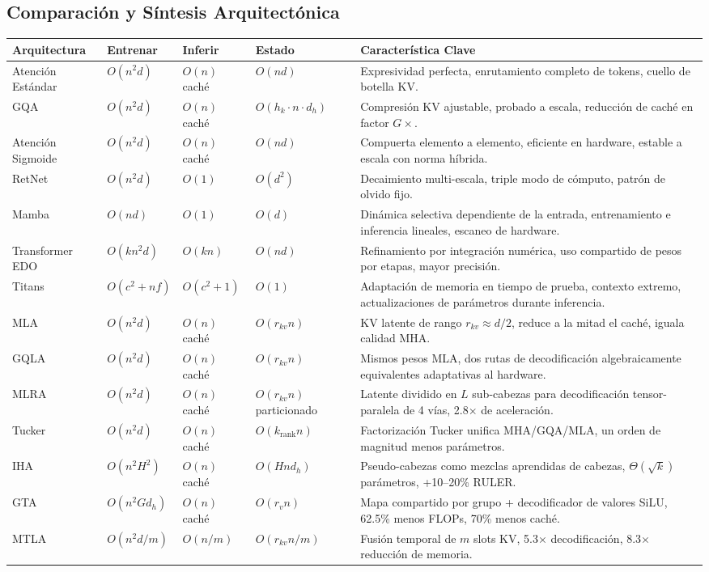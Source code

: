 \subsection{Comparación y Síntesis Arquitectónica}

\small
\begin{longtable}{p{2.0cm}p{1.8cm}p{1.6cm}p{1.6cm}p{4.5cm}}
\toprule
\textbf{Arquitectura} & \textbf{Entrenar} & \textbf{Inferir} & \textbf{Estado} & \textbf{Característica Clave} \\
\midrule
\endhead
Atención Estándar & $O(n^2 d)$ & $O(n)$ caché & $O(nd)$ & Expresividad perfecta, enrutamiento completo de tokens, cuello de botella KV. \\
GQA & $O(n^2 d)$ & $O(n)$ caché & $O(h_k \cdot n \cdot d_h)$ & Compresión KV ajustable, probado a escala, reducción de caché en factor $G \times$. \\
Atención Sigmoide & $O(n^2 d)$ & $O(n)$ caché & $O(nd)$ & Compuerta elemento a elemento, eficiente en hardware, estable a escala con norma híbrida. \\
RetNet & $O(n^2 d)$ & $O(1)$ & $O(d^2)$ & Decaimiento multi-escala, triple modo de cómputo, patrón de olvido fijo. \\
Mamba & $O(nd)$ & $O(1)$ & $O(d)$ & Dinámica selectiva dependiente de la entrada, entrenamiento e inferencia lineales, escaneo de hardware. \\
Transformer EDO & $O(kn^2 d)$ & $O(kn)$ & $O(nd)$ & Refinamiento por integración numérica, uso compartido de pesos por etapas, mayor precisión. \\
Titans & $O(c^2 + nf)$ & $O(c^2 + 1)$ & $O(1)$ & Adaptación de memoria en tiempo de prueba, contexto extremo, actualizaciones de parámetros durante inferencia. \\
MLA & $O(n^2 d)$ & $O(n)$ caché & $O(r_{kv} n)$ & KV latente de rango $r_{kv}\!\approx\!d/2$, reduce a la mitad el caché, iguala calidad MHA. \\
GQLA & $O(n^2 d)$ & $O(n)$ caché & $O(r_{kv} n)$ & Mismos pesos MLA, dos rutas de decodificación algebraicamente equivalentes adaptativas al hardware. \\
MLRA & $O(n^2 d)$ & $O(n)$ caché & $O(r_{kv} n)$ particionado & Latente dividido en $L$ sub-cabezas para decodificación tensor-paralela de 4 vías, 2.8$\times$ de aceleración. \\
Tucker & $O(n^2 d)$ & $O(n)$ caché & $O(k_{\text{rank}} n)$ & Factorización Tucker unifica MHA/GQA/MLA, un orden de magnitud menos parámetros. \\
IHA & $O(n^2 H^2)$ & $O(n)$ caché & $O(H n d_h)$ & Pseudo-cabezas como mezclas aprendidas de cabezas, $\Theta(\sqrt{k})$ parámetros, +10--20\% RULER. \\
GTA & $O(n^2 G d_h)$ & $O(n)$ caché & $O(r_v n)$ & Mapa compartido por grupo + decodificador de valores SiLU, 62.5\% menos FLOPs, 70\% menos caché. \\
MTLA & $O(n^2 d / m)$ & $O(n/m)$ & $O(r_{kv} n/m)$ & Fusión temporal de $m$ slots KV, 5.3$\times$ decodificación, 8.3$\times$ reducción de memoria. \\
\bottomrule
\end{longtable}
\normalsize

